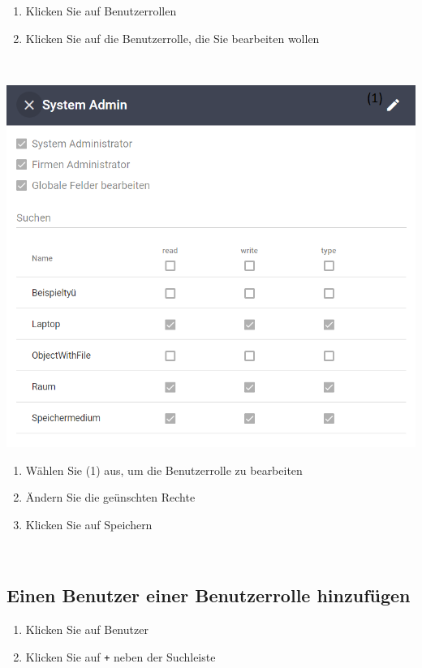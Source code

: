 \documentclass[11pt,a4paper]{report}
\begin{document}
	\begin{enumerate}
		\item Klicken Sie auf \glqq{}Benutzerrollen\grqq{}
		\item Klicken Sie auf die Benutzerrolle, die Sie bearbeiten wollen
	\end{enumerate}\\

	\begin{minipage}{0.4\linewidth}
	\includegraphics[scale=0.55]{Rollenedit.png}
	\end{minipage}
	\hfill
	\begin{minipage}{0.4\linewidth}
	\begin{enumerate}[3]
		\item Wählen Sie (1) aus, um die Benutzerrolle zu bearbeiten
		\item Ändern Sie die geünschten Rechte
		\item Klicken Sie auf Speichern
	\end{enumerate}
	\end{minipage}\\

	\subsection{Einen Benutzer einer Benutzerrolle hinzufügen}
	
	\begin{enumerate}
		\item Klicken Sie auf \glqq{}Benutzer\grqq{}
		\item Klicken Sie auf \texttt{+} neben der Suchleiste
	\end{enumerate}\\
\end{document}
